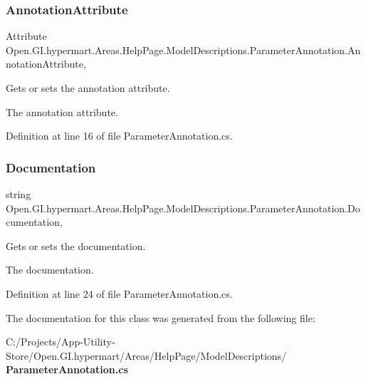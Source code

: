 \subsubsection{Annotation\+Attribute}
{\footnotesize\ttfamily Attribute Open.\+G\+I.\+hypermart.\+Areas.\+Help\+Page.\+Model\+Descriptions.\+Parameter\+Annotation.\+Annotation\+Attribute\hspace{0.3cm}{\ttfamily [get]}, {\ttfamily [set]}}



Gets or sets the annotation attribute. 

The annotation attribute. 

Definition at line 16 of file Parameter\+Annotation.\+cs.

\mbox{\label{class_open_1_1_g_i_1_1hypermart_1_1_areas_1_1_help_page_1_1_model_descriptions_1_1_parameter_annotation_a9bfcc6f5d41c3630187373bbf9993fa4}} 
\subsubsection{Documentation}
{\footnotesize\ttfamily string Open.\+G\+I.\+hypermart.\+Areas.\+Help\+Page.\+Model\+Descriptions.\+Parameter\+Annotation.\+Documentation\hspace{0.3cm}{\ttfamily [get]}, {\ttfamily [set]}}



Gets or sets the documentation. 

The documentation. 

Definition at line 24 of file Parameter\+Annotation.\+cs.



The documentation for this class was generated from the following file\+:\begin{DoxyCompactItemize}
\item 
C\+:/\+Projects/\+App-\/\+Utility-\/\+Store/\+Open.\+G\+I.\+hypermart/\+Areas/\+Help\+Page/\+Model\+Descriptions/\textbf{ Parameter\+Annotation.\+cs}\end{DoxyCompactItemize}

